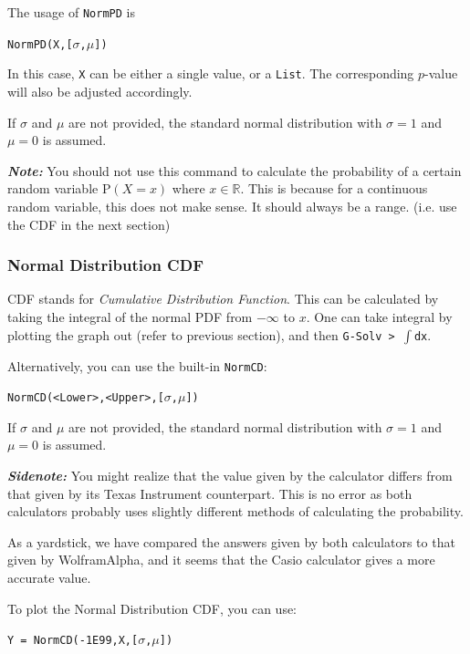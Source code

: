 \documentclass[a5paper]{memoir}
\def\code#1{\texttt{#1}}
\def\note#1{\textcolor[HTML]{109fa9}{\textbf{\textit{Note:}}} #1}
\newenvironment{sidenote}%
{\textcolor[HTML]{00559e}{\textbf{\textit{Sidenote:}}} \color[HTML]{3c90d8}}%
{\ignorespacesafterend}
\newcommand{\addtoindex}[1]{#1\index{#1}}
\begin{document}
The usage of \code{\addtoindex{NormPD}} is 
\begin{center}
	\code{NormPD(X,[$\sigma$,$\mu$])}
\end{center}

In this case, \code{X} can be either a single value, or a \code{List}. The corresponding $p$-value will also be adjusted accordingly.

If $\sigma$ and $\mu$ are not provided, the standard normal distribution with $\sigma=1$ and $\mu=0$ is assumed.

\note{You should not use this command to calculate the probability of a certain random variable $\textrm{P}(X = x)$ where $x \in \mathbb{R}$. This is because for a continuous random variable, this does not make sense. It should always be a range. (i.e. use the CDF in the next section)}

\subsubsection{Normal Distribution CDF}
CDF stands for \textit{Cumulative Distribution Function}. This can be calculated by taking the integral of the normal PDF from $-\infty$ to $x$. One can take integral by plotting the graph out (refer to previous section), and then \code{G-Solv > $\int$dx}.

Alternatively, you can use the built-in \code{\addtoindex{NormCD}}:
\begin{center}
	\code{NormCD(<Lower>,<Upper>,[$\sigma$,$\mu$])}
\end{center}

If $\sigma$ and $\mu$ are not provided, the standard normal distribution with $\sigma=1$ and $\mu=0$ is assumed.

\begin{sidenote}
	You might realize that the value given by the calculator differs from that given by its Texas Instrument counterpart. This is no error as both calculators probably uses slightly different methods of calculating the probability. 
	
	As a yardstick, we have compared the answers given by both calculators to that given by WolframAlpha, and it seems that the Casio calculator gives a more accurate value.
\end{sidenote}

To plot the Normal Distribution CDF, you can use:
\begin{center}
	\code{Y = NormCD(-1E99,X,[$\sigma$,$\mu$])}
\end{center}
\end{document}
